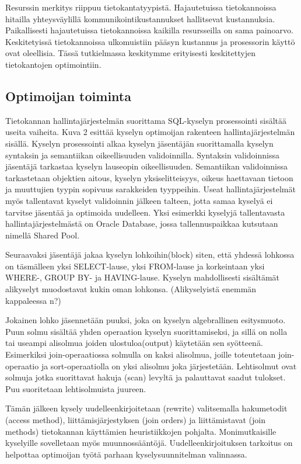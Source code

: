 \documentclass[finnish]{tktltiki2}
\theoremstyle{definition}
\theoremstyle{remark}
\begin{document}
Resurssin merkitys riippuu tietokantatyypistä. Hajautetuissa tietokannoissa hitailla yhteysväylillä kommunikointikustannukset hallitsevat kustannuksia. Paikallisesti hajautetuissa tietokannoissa kaikilla resursseilla on sama painoarvo. Keskitetyissä tietokannoissa ulkomuistiin pääsyn kustannus ja prosessorin käyttö ovat oleellisia. \cite{jarke1984} Tässä tutkielmassa keskitymme erityisesti keskitettyjen tietokantojen optimointiin.
\subsection{Optimoijan toiminta}
Tietokannan hallintajärjestelmän suorittama SQL-kyselyn prosessointi sisältää useita vaiheita. Kuva 2 esittää kyselyn optimoijan rakenteen hallintajärjestelmän sisällä.
Kyselyn prosessointi alkaa kyselyn jäsentäjän suorittamalla kyselyn syntaksin ja semantiikan oikeellisuuden validoinnilla. \cite{oracle2009doc}
Syntaksin validoinnissa jäsentäjä tarkastaa kyselyn lauseopin oikeellisuuden. Semantiikan validoinnissa tarkastetaan objektien aitous, kyselyn yksiselitteisyys, oikeus haettavaan tietoon ja muuttujien tyypin sopivuus sarakkeiden tyyppeihin. Useat hallintajärjestelmät myös
tallentavat kyselyt validoinnin jälkeen talteen, jotta samaa kyselyä ei tarvitse jäsentää ja optimoida uudelleen. Yksi esimerkki kyselyjä tallentavasta hallintajärjestelmästä on Oracle Database, jossa tallennuspaikkaa kutsutaan nimellä Shared Pool. \cite{oracle2005doc}

Seuraavaksi jäsentäjä jakaa kyselyn lohkoihin(block) siten, että yhdessä lohkossa on täsmälleen yksi SELECT-lause, yksi FROM-lause ja korkeintaan yksi WHERE-, GROUP BY- ja HAVING-lause. \cite{ramakrishnan2003database}
Kyselyn mahdollisesti sisältämät alikyselyt muodostavat kukin oman lohkonsa. %
(Alikyselyistä enemmän kappaleessa n?)

Jokainen lohko jäsennetään puuksi, joka on kyselyn algebrallinen esitysmuoto. \cite{mahajan2012}
Puun solmu sisältää yhden operaation kyselyn suorittamiseksi, ja sillä on nolla tai useampi alisolmua joiden ulostuloa(output) käytetään sen syötteenä.
Esimerkiksi join-operaatiossa solmulla on kaksi alisolmua, joille toteutetaan join-operaatio ja sort-operaatiolla on yksi alisolmu joka järjestetään.
Lehtisolmut ovat solmuja jotka suorittavat hakuja (scan) levyltä ja palauttavat saadut tulokset. 
Puu suoritetaan lehtisolmuista juureen.

Tämän jälkeen kysely uudelleenkirjoitetaan (rewrite) valitsemalla hakumetodit (access method), liittämisjärjestyksen (join orders) ja liittämistavat (join methods) tietokannan käyttämien heuristiikkojen pohjalta. Monimutkaisille kyselyille sovelletaan myös muunnossääntöjä. \cite{mahajan2012}
Uudelleenkirjoituksen tarkoitus on helpottaa optimoijan työtä parhaan kyselysuunnitelman valinnassa.
\end{document}
